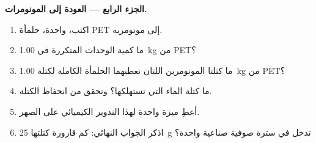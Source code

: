 \begin{problem}
\medskip
\noindent\textbf{الجزء الرابع --- العودة إلى المونومرات.}
\begin{enumerate}[resume]
  \item اكتب،  واحدة، حلمأة PET إلى
        مونومريه.
  \item ما كمية الوحدات المتكررة في \qty{1.00}{kg} من PET؟
  \item ما كتلتا المونومرين اللتان تعطيهما الحلمأة الكاملة
        لكتلة \qty{1.00}{kg} من PET؟
  \item ما كتلة الماء التي تستهلكها؟ وتحقق من انحفاظ
        الكتلة.
  \item أعطِ ميزة واحدة لهذا التدوير الكيميائي على الصهر.
  \item اذكر الجواب النهائي: كم قارورة كتلتها \qty{25}{g} تدخل في
        سترة صوفية صناعية واحدة؟
\end{enumerate}
\end{problem}
